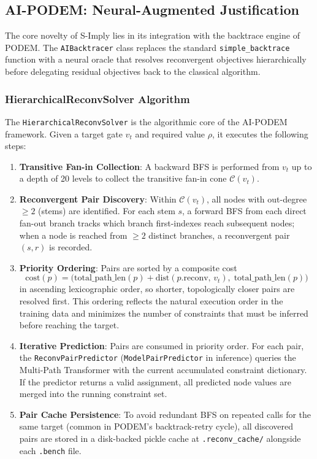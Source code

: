 \documentclass[conference]{IEEEtran}
\begin{document}
\subsection{AI-PODEM: Neural-Augmented Justification}

The core novelty of S-Imply lies in its integration with the backtrace engine of PODEM. The \texttt{AIBacktracer} class replaces the standard \texttt{simple\_backtrace} function with a neural oracle that resolves reconvergent objectives hierarchically before delegating residual objectives back to the classical algorithm.

\subsubsection{HierarchicalReconvSolver Algorithm}
\label{sec:hier_solver}

The \texttt{HierarchicalReconvSolver} is the algorithmic core of the AI-PODEM framework. Given a target gate $v_t$ and required value $\rho$, it executes the following steps:

\begin{enumerate}
   \item \textbf{Transitive Fan-in Collection}: A backward BFS is performed from $v_t$ up to a depth of 20 levels to collect the transitive fan-in cone $\mathcal{C}(v_t)$.
   \item \textbf{Reconvergent Pair Discovery}: Within $\mathcal{C}(v_t)$, all nodes with out-degree $\geq 2$ (stems) are identified. For each stem $s$, a forward BFS from each direct fan-out branch tracks which branch first-indexes reach subsequent nodes; when a node is reached from $\geq 2$ distinct branches, a reconvergent pair $(s, r)$ is recorded.
   \item \textbf{Priority Ordering}: Pairs are sorted by a composite cost
      \begin{equation}
         \text{cost}(p) = \bigl(\text{total\_path\_len}(p) + \text{dist}(p.\text{reconv},\, v_t),\;
                           \text{total\_path\_len}(p)\bigr)
      \end{equation}
      in ascending lexicographic order, so shorter, topologically closer pairs are resolved first. This ordering reflects the natural execution order in the training data and minimizes the number of constraints that must be inferred before reaching the target.
   \item \textbf{Iterative Prediction}: Pairs are consumed in priority order. For each pair, the \texttt{ReconvPairPredictor} (\texttt{ModelPairPredictor} in inference) queries the Multi-Path Transformer with the current accumulated constraint dictionary. If the predictor returns a valid assignment, all predicted node values are merged into the running constraint set.
   \item \textbf{Pair Cache Persistence}: To avoid redundant BFS on repeated calls for the same target (common in PODEM's backtrack-retry cycle), all discovered pairs are stored in a disk-backed pickle cache at \texttt{.reconv\_cache/} alongside each \texttt{.bench} file.
\end{enumerate}
\end{document}
